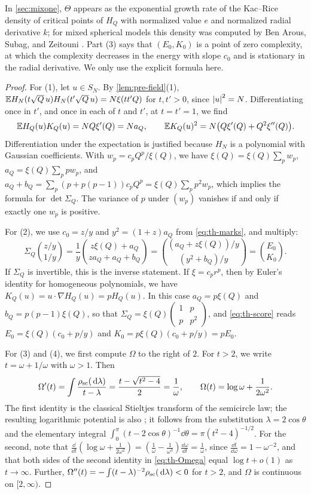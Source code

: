 In \cref{sec:mixone}, $\Theta$ appears as the exponential growth rate of the Kac--Rice density of critical points of $H_Q$ with normalized value $e$ and normalized radial derivative $k$; for mixed spherical models this density was computed by Ben Arous, Subag, and Zeitouni \cite[Theorem~5, (3.4), and Section~4.1, (4.2)]{BenArousSubagZeitouni2020}. Part (3) says that $(E_0,K_0)$ is a point of zero complexity, at which the complexity decreases in the energy with slope $c_0$ and is stationary in the radial derivative. We only use the explicit formula here.

\begin{proof}
For (1), let $u\in S_N$. By \cref{lem:pre-field}(1), $\mathbb E H_N(t\sqrt Q\,u)H_N(t'\sqrt Q\,u)=N\xi(tt'Q)$ for $t,t'>0$, since $\left|u\right|^2=N$. Differentiating once in $t'$, and once in each of $t$ and $t'$, at $t=t'=1$, we find
\[
\mathbb E H_Q(u)K_Q(u)=NQ\xi'(Q)=Na_Q,\qquad\mathbb E K_Q(u)^2=N\big(Q\xi'(Q)+Q^2\xi''(Q)\big).
\]
Differentiation under the expectation is justified because $H_N$ is a polynomial with Gaussian coefficients. With $w_p=c_pQ^p/\xi(Q)$, we have $\xi(Q)=\xi(Q)\sum_pw_p$, $a_Q=\xi(Q)\sum_ppw_p$, and $a_Q+b_Q=\sum_p(p+p(p-1))c_pQ^p=\xi(Q)\sum_pp^2w_p$, which implies the formula for $\det\Sigma_Q$. The variance of $p$ under $(w_p)$ vanishes if and only if exactly one $w_p$ is positive.

For (2), we use $c_0=z/y$ and $y^2=(1+z)a_Q$ from \eqref{eq:th-marks}, and multiply:
\[
\Sigma_Q\binom{z/y}{1/y}=\frac1y\binom{z\xi(Q)+a_Q}{za_Q+a_Q+b_Q}=\binom{(a_Q+z\xi(Q))/y}{(y^2+b_Q)/y}=\binom{E_0}{K_0}.
\]
If $\Sigma_Q$ is invertible, this is the inverse statement. If $\xi=c_pr^p$, then by Euler's identity for homogeneous polynomials, we have $K_Q(u)=u\cdot\nabla H_Q(u)=pH_Q(u)$. In this case $a_Q=p\xi(Q)$ and $b_Q=p(p-1)\xi(Q)$, so that $\Sigma_Q=\xi(Q)\begin{pmatrix}1&p\\p&p^2\end{pmatrix}$, and \eqref{eq:th-score} reads $E_0=\xi(Q)(c_0+p/y)$ and $K_0=p\xi(Q)(c_0+p/y)=pE_0$.

For (3) and (4), we first compute $\Omega$ to the right of $2$. For $t>2$, we write $t=\omega+1/\omega$ with $\omega>1$. Then
\begin{equation}\label{eq:th-Omega}
\Omega'(t)=\int\frac{\rho_{\rm sc}(\,\mathrm d\lambda)}{t-\lambda}=\frac{t-\sqrt{t^2-4}}2=\frac1\omega,\qquad\Omega(t)=\log\omega+\frac1{2\omega^2}.
\end{equation}
The first identity is the classical Stieltjes transform of the semicircle law; the resulting logarithmic potential is also \cite[(3.3)]{BenArousSubagZeitouni2020}; it follows from the substitution $\lambda=2\cos\theta$ and the elementary integral $\int_0^\pi(t-2\cos\theta)^{-1}\dd\theta=\pi(t^2-4)^{-1/2}$. For the second, note that $\frac{\dd}{\dd t}(\log\omega+\frac1{2\omega^2})=(\frac1\omega-\frac1{\omega^3})\frac{\dd\omega}{\dd t}=\frac1\omega$, since $\frac{\dd t}{\dd\omega}=1-\omega^{-2}$, and that both sides of the second identity in \eqref{eq:th-Omega} equal $\log t+o(1)$ as $t\to\infty$. Further, $\Omega''(t)=-\int(t-\lambda)^{-2}\rho_{\rm sc}(\,\mathrm d\lambda)<0$ for $t>2$, and $\Omega$ is continuous on $[2,\infty)$.


\end{proof}

